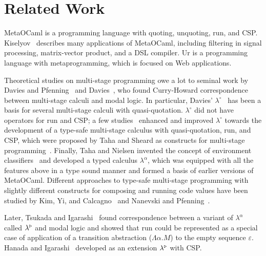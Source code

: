 
\section{Related Work}
\label{sec:related-work}


MetaOCaml is a programming language with quoting, unquoting, run, and CSP.
Kiselyov~\cite{8384206} describes many applications of MetaOCaml, including
filtering in signal processing, matrix-vector product, and a DSL compiler.
Ur\cite{chlipala2010ur} is a programming language with metaprogramming, which
is focused on Web applications.


Theoretical studies on multi-stage programming owe a lot to seminal
work by Davies and Pfenning~\cite{DaviesPfenning01JACM} and
Davies~\cite{davies1996temporal}, who found Curry-Howard
correspondence between multi-stage calculi and modal logic.  In
particular, Davies' $\lambda^\circ$~\cite{davies1996temporal} has been
a basis for several multi-stage calculi with quasi-quotation.  $\lambda^\circ$
did not have operators for run and CSP; a few
studies~\cite{benaissa1999logical,MoggiTahaBenaissaSheard99ESOP}
enhanced and improved $\lambda^\circ$ towards the development of a
type-safe multi-stage calculus with quasi-quotation, run, and CSP,
which were proposed by Taha and Sheard as constructs for multi-stage
programming~\cite{MetaML}.
Finally, Taha and Nielsen invented the concept of environment
classifiers~\cite{taha2003environment} and developed a typed calculus
$\lambda^\alpha$, which was equipped with all the features above in a
type sound manner and formed a basis of earlier versions of MetaOCaml.
Different approaches to type-safe multi-stage programming with
slightly different constructs for composing and running code values have been studied by Kim, Yi,
and Calcagno~\cite{DBLP:conf/popl/KimYC06} and Nanevski and Pfenning~\cite{DBLP:journals/jfp/NanevskiP05}.

Later, Tsukada and Igarashi~\cite{Tsukada} found correspondence
between a variant of \(\lambda^\alpha\) called $\lambda^{\mathop{\triangleright}}$
and modal logic and showed that run could be represented as a special
case of application of a transition abstraction ($\Lambda\alpha.M$) to
the empty sequence $\varepsilon$.  Hanada and
Igarashi~\cite{Hanada2014} developed \LTP as an extension
$\lambda^{\mathop{\triangleright}}$ with CSP.

